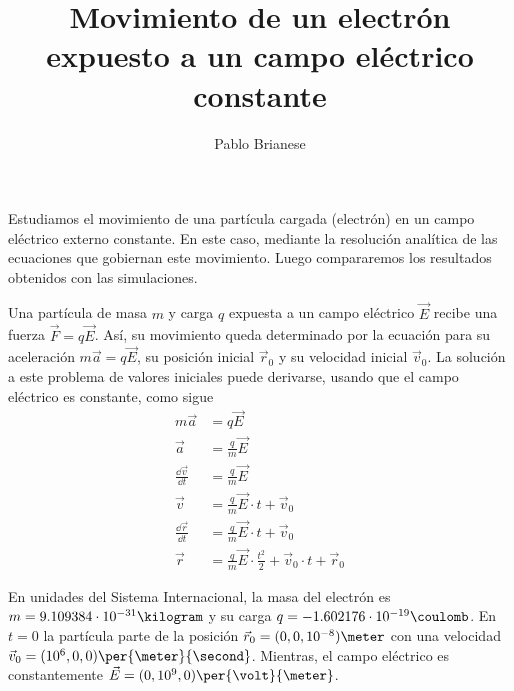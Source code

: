 \documentclass{article}
\title{Movimiento de un electrón expuesto a un campo eléctrico constante}
\author{Pablo Brianese}
\begin{document}
  \maketitle
  Estudiamos el movimiento de una partícula cargada (electrón) en un campo eléctrico externo constante.
  En este caso, mediante la resolución analítica de las ecuaciones que gobiernan este movimiento.
  Luego compararemos los resultados obtenidos con las simulaciones.

  Una partícula de masa \(m\) y carga \(q\) expuesta a un campo eléctrico \(\vec{E}\) recibe una fuerza \(\vec{F} = q \vec{E}\).
  Así, su movimiento queda determinado por la ecuación para su aceleración \(m \vec{a} = q \vec{E}\), su posición inicial \(\vec{r}_0\) y su velocidad inicial \(\vec{v}_0\).
  La solución a este problema de valores iniciales puede derivarse, usando que el campo eléctrico es constante, como sigue
  \begin{align}
    m \vec{a}
      &=
      q \vec{E}
    \\
    \vec{a}
      &=
      \frac{q}{m} \vec{E}
    \\
    \frac{\dd \vec{v}}{\dd t}
      &=
      \frac{q}{m} \vec{E}
    \\
    \vec{v}
      &=
      \frac{q}{m} \vec{E} \cdot t + \vec{v}_0
    \\
    \frac{\dd \vec{r}}{\dd t}
      &=
      \frac{q}{m} \vec{E} \cdot t + \vec{v}_0
    \\
    \vec{r}
      &=
      \frac{q}{m} \vec{E} \cdot \frac{t^2}{2} + \vec{v}_0 \cdot t + \vec{r}_0
  \end{align}

  En unidades del Sistema Internacional, la masa del electrón es \(m = 9.109384 \cdot 10^{-31} \kilogram\) y su carga \(q = -1.602176 \cdot 10^{-19} \coulomb\).
  En \(t = 0\) la partícula parte de la posición \(\vec{r}_0 = (0, 0, 10^{- 8}) \meter\) con una velocidad \(\vec{v}_0 = (10^6, 0, 0) \per{\meter}{\second}\).
  Mientras, el campo eléctrico es constantemente \(\vec{E} = (0, 10^9, 0) \per{\volt}{\meter}\).
\end{document}
